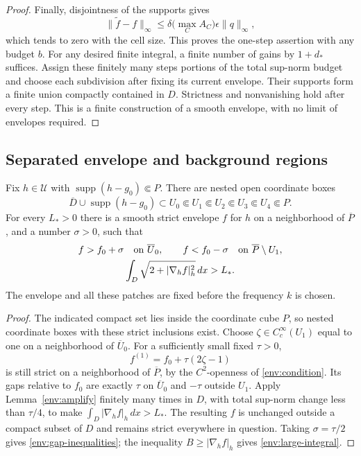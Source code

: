 \begin{proof}
Finally, disjointness of the supports gives
\[
 \|\widetilde f-f\|_\infty
 \le\delta\bigl(\max_C A_C\bigr)\epsilon\|q\|_\infty,
\]
which tends to zero with the cell size. This proves the one-step
assertion with any budget $b$. For any desired finite integral, a
finite number of gains by $1+d_*$ suffices. Assign these finitely
many steps portions of the total sup-norm budget and choose each
subdivision after fixing its current envelope. Their supports form a
finite union compactly contained in $D$. Strictness and nonvanishing
hold after every step. This is a finite construction of a smooth
envelope, with no limit of envelopes required.
\end{proof}

\subsection{Separated envelope and background regions}

\begin{lemma}\label{env:gaps}
Fix $h\in\mathcal U$ with $\operatorname{supp}(h-g_0)\Subset P$.
There are nested open coordinate boxes
\[
 \overline D\cup\operatorname{supp}(h-g_0)\subset U_0
 \Subset U_1\Subset U_2\Subset U_3\Subset U_4\Subset P.
\]
For every $L_*>0$ there is a smooth strict envelope $f$ for $h$ on
a neighborhood of $\overline P$, and a number $\sigma>0$, such that
\begin{gather}
 f>f_0+\sigma\quad\hbox{on }\overline U_0,
 \qquad
 f<f_0-\sigma\quad\hbox{on }\overline P\setminus U_1,
 \label{env:gap-inequalities}\\
 \int_D\sqrt{2+|\nabla_h f|_h^2}\,dx>L_*.
 \label{env:large-integral}
\end{gather}
The envelope and all these patches are fixed before the frequency $k$
is chosen.
\end{lemma}

\begin{proof}
The indicated compact set lies inside the coordinate cube $P$, so
nested coordinate boxes with these strict inclusions exist. Choose
$\zeta\in C_c^\infty(U_1)$ equal to one on a neighborhood of
$\overline U_0$. For a sufficiently small fixed $\tau>0$,
\[
 f^{(1)}=f_0+\tau(2\zeta-1)
\]
is still strict on a neighborhood of $\overline P$, by the
$C^2$-openness of \eqref{env:condition}. Its gaps relative to $f_0$
are exactly $\tau$ on $\overline U_0$ and $-\tau$ outside $U_1$.
Apply Lemma~\ref{env:amplify} finitely many times in $D$, with total
sup-norm change less than $\tau/4$, to make
$\int_D|\nabla_hf|_h\,dx>L_*$. The resulting $f$ is unchanged
outside a compact subset of $D$ and remains strict everywhere in
question. Taking $\sigma=\tau/2$ gives
\eqref{env:gap-inequalities}; the inequality $B\ge|\nabla_hf|_h$
gives \eqref{env:large-integral}.
\end{proof}
